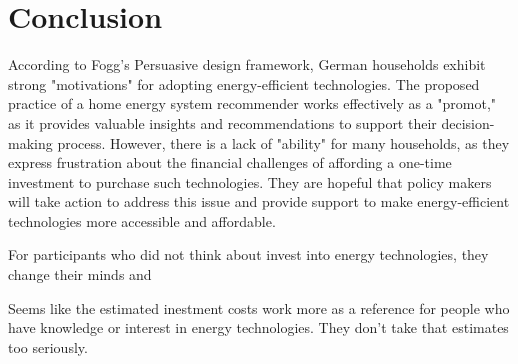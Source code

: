 \chapter{Conclusion}

According to Fogg's Persuasive design framework, 
German households exhibit strong "motivations" for adopting energy-efficient technologies. 
The proposed practice of a home energy system recommender works effectively as a "promot," as it provides valuable insights and recommendations to support their decision-making process. 
However, there is a lack of "ability" for many households, 
as they express frustration about the financial challenges of affording a one-time investment to purchase such technologies. 
They are hopeful that policy makers will take action to address this issue and provide support to make energy-efficient technologies more accessible and affordable.

For participants who did not think about invest into energy technologies,
they change their minds and 

Seems like the estimated inestment costs work more as a reference for people who have knowledge or interest in energy technologies. 
They don't take that estimates too seriously. 
